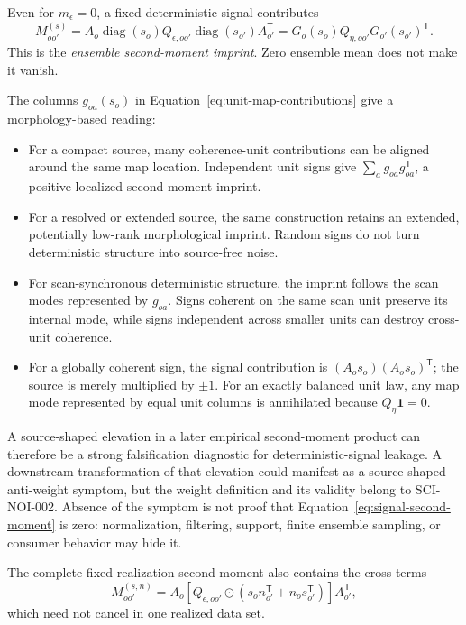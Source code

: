 \documentclass[11pt]{article}
\newcommand{\diag}{\operatorname{diag}}
\newcommand{\one}{\bm{1}}
\begin{document}
Even for $m_\epsilon=0$, a fixed deterministic signal contributes
\begin{equation}
  M_{oo'}^{(s)}
  =A_o\diag(s_o)Q_{\epsilon,oo'}\diag(s_{o'})A_{o'}^{\mathsf T}
  =G_o(s_o)Q_{\eta,oo'}G_{o'}(s_{o'})^{\mathsf T}.
  \label{eq:signal-second-moment}
\end{equation}
This is the \emph{ensemble second-moment imprint}.  Zero ensemble mean does
not make it vanish.

The columns $g_{oa}(s_o)$ in
Equation~\eqref{eq:unit-map-contributions} give a morphology-based reading:
\begin{itemize}
\item For a compact source, many coherence-unit contributions can be aligned
around the same map location.  Independent unit signs give
$\sum_a g_{oa}g_{oa}^{\mathsf T}$, a positive localized second-moment imprint.
\item For a resolved or extended source, the same construction retains an
extended, potentially low-rank morphological imprint.  Random signs do not
turn deterministic structure into source-free noise.
\item For scan-synchronous deterministic structure, the imprint follows the
scan modes represented by $g_{oa}$.  Signs coherent on the same scan unit
preserve its internal mode, while signs independent across smaller units can
destroy cross-unit coherence.
\item For a globally coherent sign, the signal contribution is
$(A_os_o)(A_os_o)^{\mathsf T}$; the source is merely multiplied by $\pm1$.
For an exactly balanced unit law, any map mode represented by equal unit
columns is annihilated because $Q_\eta\one=0$.
\end{itemize}

A source-shaped elevation in a later empirical second-moment product can
therefore be a strong falsification diagnostic for deterministic-signal
leakage.  A downstream transformation of that elevation could manifest as a
source-shaped anti-weight symptom, but the weight definition and its validity
belong to SCI-NOI-002.  Absence of the symptom is not proof that
Equation~\eqref{eq:signal-second-moment} is zero: normalization, filtering,
support, finite ensemble sampling, or consumer behavior may hide it.

The complete fixed-realization second moment also contains the cross terms
\begin{equation}
  M^{(s,n)}_{oo'}=
  A_o\!\left[
    Q_{\epsilon,oo'}\odot
    (s_on_{o'}^{\mathsf T}+n_os_{o'}^{\mathsf T})
  \right]A_{o'}^{\mathsf T},
  \label{eq:signal-noise-cross-imprint}
\end{equation}
which need not cancel in one realized data set.
\end{document}
